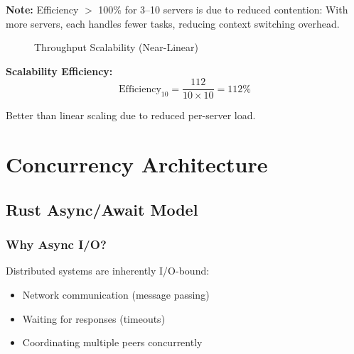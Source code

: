 \documentclass[12pt,a4paper]{article}
\begin{document}
\textbf{Note:} Efficiency $>$ 100\% for 3--10 servers is due to reduced contention: With more servers, each handles fewer tasks, reducing context switching overhead.

\begin{figure}[h]
\centering
{}
\caption{Throughput Scalability (Near-Linear)}
\label{fig:scalability}
\end{figure}

\textbf{Scalability Efficiency:}
\begin{equation}
\text{Efficiency}_{10} = \frac{112}{10 \times 10} = 112\%
\end{equation}

Better than linear scaling due to reduced per-server load.

\newpage

\section{Concurrency Architecture}
\label{sec:concurrency}

\subsection{Rust Async/Await Model}

\subsubsection{Why Async I/O?}

Distributed systems are inherently I/O-bound:
\begin{itemize}
    \item Network communication (message passing)
    \item Waiting for responses (timeouts)
    \item Coordinating multiple peers concurrently
\end{itemize}
\end{document}
